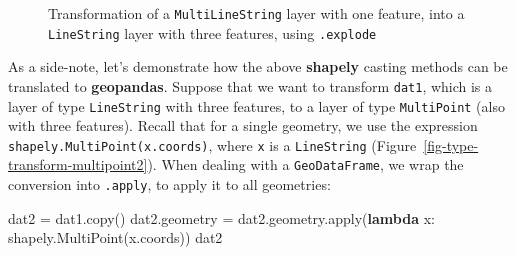 \documentclass[
  letterpaper,
]{krantz}
\newenvironment{Shaded}{\begin{snugshade}}{\end{snugshade}}
\newcommand{\BuiltInTok}[1]{\textcolor[rgb]{0.00,0.23,0.31}{#1}}
\newcommand{\KeywordTok}[1]{\textcolor[rgb]{0.00,0.23,0.31}{\textbf{#1}}}
\newcommand{\NormalTok}[1]{\textcolor[rgb]{0.00,0.23,0.31}{#1}}
\newcommand{\OperatorTok}[1]{\textcolor[rgb]{0.37,0.37,0.37}{#1}}
\begin{document}
\begin{figure}

\begin{minipage}{0.50\linewidth}



\end{minipage}%
%
\begin{minipage}{0.50\linewidth}



\end{minipage}%

\caption{\label{fig-multilinestring-to-linestring}Transformation of a
\texttt{\textquotesingle{}MultiLineString\textquotesingle{}} layer with
one feature, into a
\texttt{\textquotesingle{}LineString\textquotesingle{}} layer with three
features, using \texttt{.explode}}

\end{figure}%

As a side-note, let's demonstrate how the above \textbf{shapely} casting
methods can be translated to \textbf{geopandas}. Suppose that we want to
transform \texttt{dat1}, which is a layer of type
\texttt{\textquotesingle{}LineString\textquotesingle{}} with three
features, to a layer of type
\texttt{\textquotesingle{}MultiPoint\textquotesingle{}} (also with three
features). Recall that for a single geometry, we use the expression
\texttt{shapely.MultiPoint(x.coords)}, where \texttt{x} is a
\texttt{\textquotesingle{}LineString\textquotesingle{}}
(Figure~\ref{fig-type-transform-multipoint2}). When dealing with a
\texttt{GeoDataFrame}, we wrap the conversion into \texttt{.apply}, to
apply it to all geometries:

\begin{Shaded}
\begin{Highlighting}[]
\NormalTok{dat2 }\OperatorTok{=}\NormalTok{ dat1.copy()}
\NormalTok{dat2.geometry }\OperatorTok{=}\NormalTok{ dat2.geometry.}\BuiltInTok{apply}\NormalTok{(}\KeywordTok{lambda}\NormalTok{ x: shapely.MultiPoint(x.coords))}
\NormalTok{dat2}
\end{Highlighting}
\end{Shaded}
\end{document}
